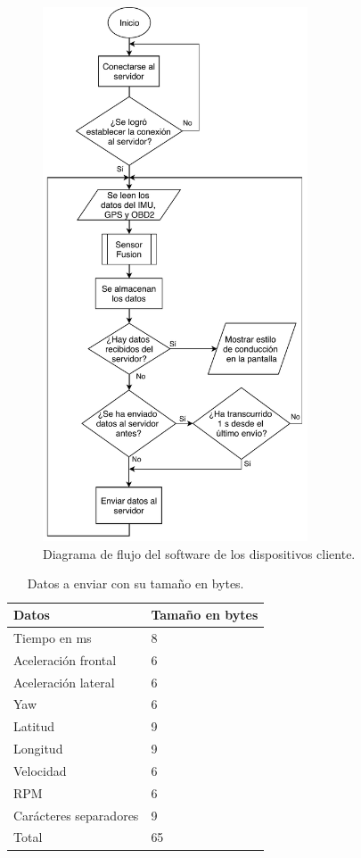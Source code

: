 \begin{figure}[hbtp!]
\centering
\includegraphics[width=0.7\textwidth]{Flujo_cliente.pdf}
\caption{Diagrama de flujo del software de los dispositivos cliente.}
\label{fig:Flujo_cliente}
\end{figure}

\bgroup
\def\arraystretch{1}%
\begin{table}[htbp!]
\centering
\caption[Datos a enviar con su tamaño en bytes]{Datos a enviar con su tamaño en bytes.}
\begin{tabular}{ll}
\toprule
Datos & Tamaño en bytes \\ \midrule
Tiempo en ms & 8 \\
Aceleración frontal & 6 \\
Aceleración lateral & 6 \\
Yaw & 6 \\
Latitud & 9 \\
Longitud & 9 \\
Velocidad & 6 \\
RPM & 6 \\
Carácteres separadores & 9 \\ \midrule
Total & 65 \\ \bottomrule
\end{tabular}
\label{diag:datos_enviar}
\end{table}
\egroup


